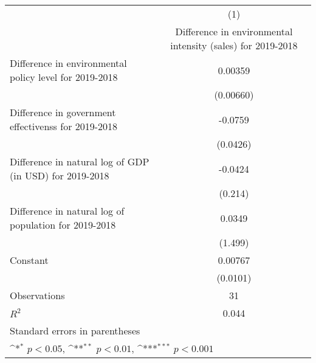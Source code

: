 {
\def\sym#1{\ifmmode^{#1}\else\(^{#1}\)\fi}
\begin{tabular}{l*{1}{c}}
\hline\hline
                    &\multicolumn{1}{c}{(1)}\\
                    &\multicolumn{1}{c}{Difference in environmental intensity (sales) for 2019-2018}\\
\hline
Difference in environmental policy level for 2019-2018&     0.00359         \\
                    &   (0.00660)         \\
[1em]
Difference in government effectivenss for 2019-2018&     -0.0759         \\
                    &    (0.0426)         \\
[1em]
Difference in natural log of GDP (in USD) for 2019-2018&     -0.0424         \\
                    &     (0.214)         \\
[1em]
Difference in natural log of population for 2019-2018&      0.0349         \\
                    &     (1.499)         \\
[1em]
Constant            &     0.00767         \\
                    &    (0.0101)         \\
\hline
Observations        &          31         \\
\(R^{2}\)           &       0.044         \\
\hline\hline
\multicolumn{2}{l}{\footnotesize Standard errors in parentheses}\\
\multicolumn{2}{l}{\footnotesize \sym{*} \(p<0.05\), \sym{**} \(p<0.01\), \sym{***} \(p<0.001\)}\\
\end{tabular}
}
